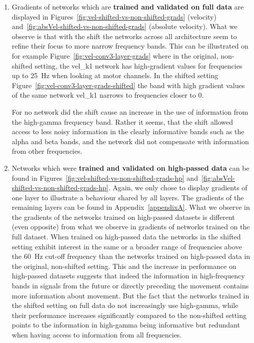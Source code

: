 \begin{enumerate}
    \item Gradients of networks which are \textbf{trained and validated on full data} are displayed in Figures~\ref{fig:vel-shifted-vs-non-shifted-grads} (velocity) and~\ref{fig:absVel-shifted-vs-non-shifted-grads} (absolute velocity).
    What we observe is that with the shift the networks across all architecture seem to refine their focus to more narrow frequency bands.
    This can be illustrated on for example Figure~\ref{fig:vel-conv3-layer-grads} where in the original, non-shifted setting, the vel\_k1 network has high-gradient values for frequencies up to 25~Hz when looking at motor channels.
    In the shifted setting Figure~\ref{fig:vel-conv3-layer-grads-shifted} the band with high gradient values of the same network vel\_k1 narrows to frequencies closer to 0.
    
    For no network  did the shift cause an increase in the use of information from the high-gamma frequency band.
    Rather it seems, that the shift allowed access to less noisy information in the clearly informative bands such as the alpha and beta bands, and the network did not compensate with information from other frequencies.
    \item Networks which were \textbf{trained and validated on high-passed data} can be found in Figures~\ref{fig:vel-shifted-vs-non-shifted-grads-hp} and~\ref{fig:absVel-shifted-vs-non-shifted-grads-hp}.
    Again, we only chose to display gradients of one layer to illustrate a behaviour shared by all layers.
    The gradients of the remaining layers can be found in Appendix~\ref{appendixA}.
    What we observe in the gradients of the networks trained on high-passed datasets is different (even opposite) from what we observe in gradients of networks trained on the full dataset.
    When trained on high-passed data the networks in the shifted setting exhibit interest in the same or a broader range of frequencies above the 60~Hz cut-off frequency than the networks trained on high-passed data in the original, non-shifted setting.
    This and the increase in performance on high-passed datasets suggests that indeed the information in high-frequency bands in signals from the future or directly preceding the movement contains more information about movement.
    But the fact that the networks trained in the shifted setting on full data do not increasingly use high-gamma, while their performance increases significantly compared to the non-shifted setting points to the information in high-gamma being informative but redundant when having access to information from all frequencies.
\end{enumerate}


